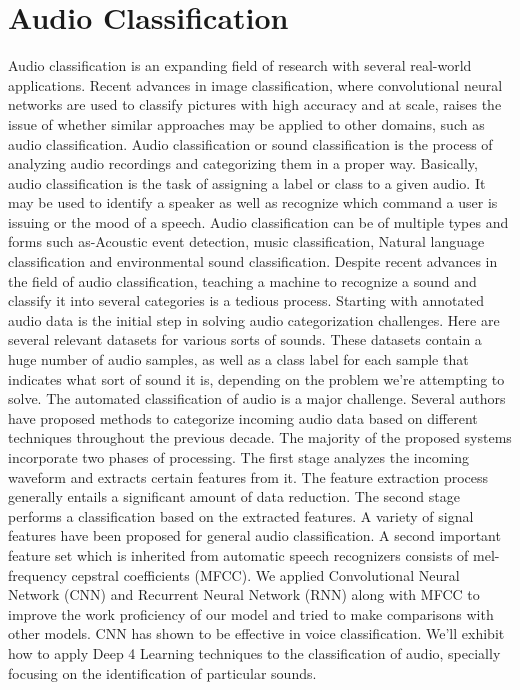 \section{Audio Classification} 
Audio classification is an expanding field of research with several real-world applications. Recent advances in image classification, where convolutional neural networks are used to classify pictures with high accuracy and at scale, raises the issue of whether similar approaches may be applied to other domains, such as audio classification. Audio classification or sound classification is the process of analyzing audio recordings and categorizing them in a proper way. Basically, audio classification is the task of assigning a label or class to a given audio. It may be used to identify a speaker as well as recognize which command a user is issuing or the mood of a speech. Audio classification can be of multiple types and forms such as-Acoustic event detection, music classification, Natural language classification and environmental sound classification. Despite recent advances in the field of audio classification, teaching a machine to recognize a sound and classify it into several categories is a tedious process. Starting with annotated audio data is the initial step in solving audio categorization challenges. Here are several relevant datasets for various sorts of sounds. These datasets contain a huge number of audio samples, as well as a class label for each sample that indicates what sort of sound it is, depending on the problem we’re attempting to solve. The automated classification of audio is a major challenge. Several authors have proposed methods to categorize incoming audio data based on different techniques throughout the previous decade. The majority of the proposed systems incorporate two phases of processing. The first stage analyzes the incoming waveform and extracts certain features from it. The feature extraction process generally entails a significant amount of data reduction. The second stage performs a classification based on the extracted features. A variety of signal features have been proposed for general audio classification. A second important feature set which is inherited from automatic speech recognizers consists of mel-frequency cepstral coefficients (MFCC). We applied Convolutional Neural Network (CNN) and Recurrent Neural Network (RNN) along with MFCC to improve the work proficiency of our model and tried to make comparisons with other models. CNN has shown to be effective in voice classification. We’ll exhibit how to apply Deep 4 Learning techniques to the classification of audio, specially focusing on the identification of particular sounds.
